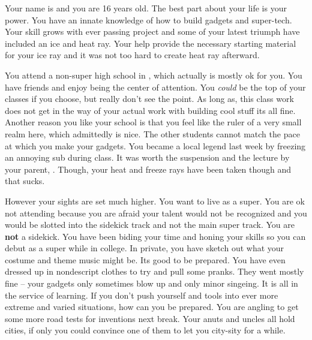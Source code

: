 \documentclass[char]{LRSguildcamp1}
\begin{document}
\name{\cTeen{}}



Your name is \cTeen{} and you are 16 years old. The best part about your life is your power. You have an innate knowledge of how to build gadgets and super-tech. Your skill grows with ever passing project and some of your latest triumph have included an ice and heat ray. Your \cOldest{\uncle} help provide the necessary starting material for your ice ray and it was not too hard to create heat ray afterward. 

You attend \pNormalSchool{} a non-super high school in \pCityArchitect{}, which actually is mostly ok for you. You have friends and enjoy being the center of attention. You \textsl{could} be the top of your classes if you choose, but really don't see the point. As long as, this class work does not get in the way of your actual work with building cool stuff its all fine. Another reason you like your school is that you feel like the ruler of a very small realm here, which admittedly is nice. The other students cannot match the pace at which you make your gadgets. You became a local legend last week by freezing an annoying sub during class. It was worth the suspension and the lecture by your parent, \cArchitect{}. Though, your heat and freeze rays have been taken though and that sucks. 

However your sights are set much higher. You want to live as a super. You are ok not attending \pSuperSchool{} because you are afraid your talent would not be recognized and you would be slotted into the sidekick track and not the main super track. You are \textbf{not} a sidekick. You have been biding your time and honing your skills so you can debut as a super while in college. In private, you have sketch out what your costume and theme music might be. Its good to be prepared. You have even dressed up in nondescript clothes to try and pull some pranks.  They went mostly fine -- your gadgets only sometimes blow up and only minor singeing.  It is all in the service of learning. If you don't push yourself and tools into ever more extreme and varied situations, how can you be prepared. You are angling to get some more road tests for inventions next break. Your anuts and uncles all hold cities, if only you could convince one of them to let you city-sity for a while.
\end{document}
